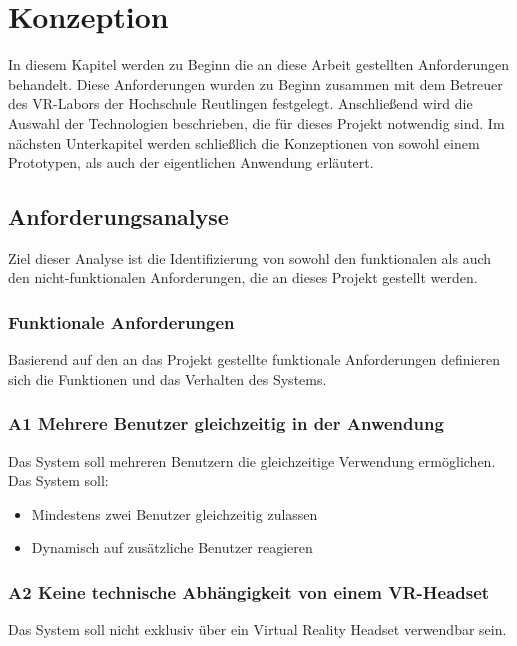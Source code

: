 \section{Konzeption} \label{Konzeption}
In diesem Kapitel werden zu Beginn die an diese Arbeit gestellten Anforderungen behandelt. Diese Anforderungen wurden zu Beginn zusammen mit dem Betreuer des VR-Labors der Hochschule Reutlingen festgelegt. Anschließend wird die Auswahl der Technologien beschrieben, die für dieses Projekt notwendig sind. Im nächsten Unterkapitel werden schließlich die Konzeptionen von sowohl einem Prototypen, als auch der eigentlichen Anwendung erläutert.  

\subsection{Anforderungsanalyse}
Ziel dieser Analyse ist die Identifizierung von sowohl den funktionalen als auch den nicht-funktionalen Anforderungen, die an dieses Projekt gestellt werden. 

\subsubsection{Funktionale Anforderungen}
Basierend auf den an das Projekt gestellte funktionale Anforderungen definieren sich die Funktionen und das Verhalten des Systems.

\subsubsection*{A1 Mehrere Benutzer gleichzeitig in der Anwendung \label{A1}}

Das System soll mehreren Benutzern die gleichzeitige Verwendung ermöglichen.\\

Das System soll: 
\begin{itemize}
\item Mindestens zwei Benutzer gleichzeitig zulassen
\item Dynamisch auf zusätzliche Benutzer reagieren
\end{itemize}

\newpage
	
\subsubsection*{A2 \label{A2} Keine technische Abhängigkeit von einem VR-Headset}
Das System soll nicht exklusiv über ein Virtual Reality Headset verwendbar sein.\\

